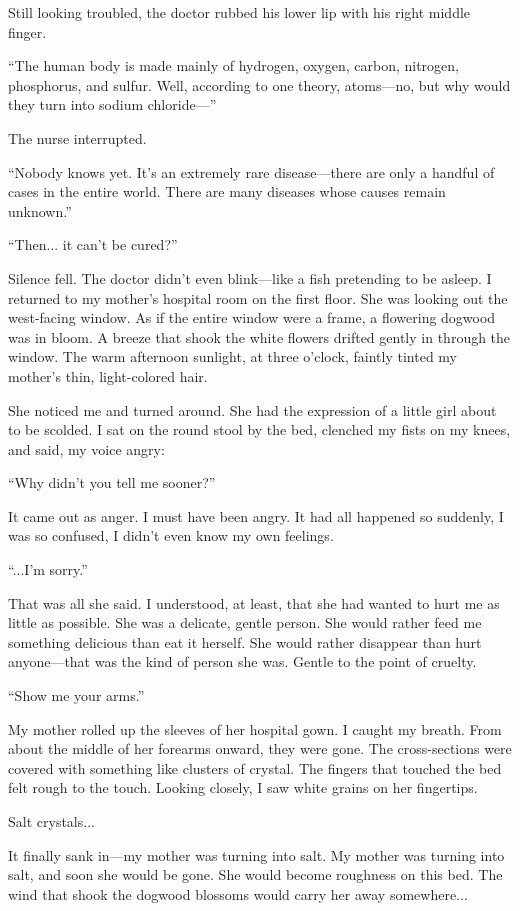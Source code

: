 \documentclass[
    a4paper,
    12pt,
    twoside,
    openany,
    UTF8,
    fontset=windows
]{ctexbook}
\begin{document}
Still looking troubled, the doctor rubbed his lower lip with his right middle finger.

``The human body is made mainly of hydrogen, oxygen, carbon, nitrogen, phosphorus, and sulfur. Well, according to one theory, atoms---no, but why would they turn into sodium chloride---''

The nurse interrupted.

``Nobody knows yet. It's an extremely rare disease---there are only a handful of cases in the entire world. There are many diseases whose causes remain unknown.''

``Then... it can't be cured?''

Silence fell. The doctor didn't even blink---like a fish pretending to be asleep. I returned to my mother's hospital room on the first floor. She was looking out the west-facing window. As if the entire window were a frame, a flowering dogwood was in bloom. A breeze that shook the white flowers drifted gently in through the window. The warm afternoon sunlight, at three o'clock, faintly tinted my mother's thin, light-colored hair.

She noticed me and turned around. She had the expression of a little girl about to be scolded. I sat on the round stool by the bed, clenched my fists on my knees, and said, my voice angry:

``Why didn't you tell me sooner?''

It came out as anger. I must have been angry. It had all happened so suddenly, I was so confused, I didn't even know my own feelings.

``...I'm sorry.''

That was all she said. I understood, at least, that she had wanted to hurt me as little as possible. She was a delicate, gentle person. She would rather feed me something delicious than eat it herself. She would rather disappear than hurt anyone---that was the kind of person she was. Gentle to the point of cruelty.

``Show me your arms.''

My mother rolled up the sleeves of her hospital gown. I caught my breath. From about the middle of her forearms onward, they were gone. The cross-sections were covered with something like clusters of crystal. The fingers that touched the bed felt rough to the touch. Looking closely, I saw white grains on her fingertips.

Salt crystals...

It finally sank in---my mother was turning into salt. My mother was turning into salt, and soon she would be gone. She would become roughness on this bed. The wind that shook the dogwood blossoms would carry her away somewhere...
\end{document}
